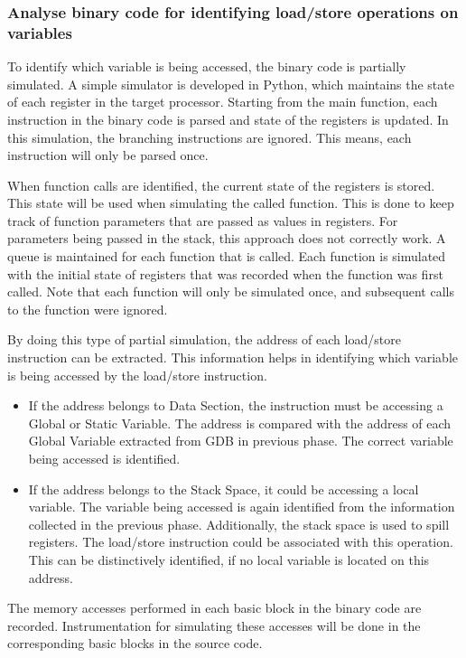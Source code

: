 \subsubsection{Analyse binary code for identifying load/store operations on variables}
To identify which variable is being accessed, the binary code is partially simulated. A simple simulator is developed in Python, which maintains the state of each register in the target processor. Starting from the main function, each instruction in the binary code is parsed and state of the registers is updated. In this simulation, the branching instructions are ignored. This means, each instruction will only be parsed once. 

When function calls are identified, the current state of the registers is stored. This state will be used when simulating the called function. This is done to keep track of function parameters that are passed as values in registers. For parameters being passed in the stack, this approach does not correctly work. A queue is maintained for each function that is called. Each function is simulated with the initial state of registers that was recorded when the function was first called. Note that each function will only be simulated once, and subsequent calls to the function were ignored.

By doing this type of partial simulation, the address of each load/store instruction can be extracted. This information helps in identifying which variable is being accessed by the load/store instruction. 

\begin{itemize}
\item If the address belongs to Data Section, the instruction must be accessing a Global or Static Variable. The address is compared with the address of each Global Variable extracted from GDB in previous phase. The correct variable being accessed is identified. 
\item If the address belongs to the Stack Space, it could be accessing a local variable. The variable being accessed is again identified from the information collected in the previous phase. Additionally, the stack space is used to spill registers. The load/store instruction could be associated with this operation. This can be distinctively identified, if no local variable is located on this address.
\end{itemize}

The memory accesses performed in each basic block in the binary code are recorded. Instrumentation for simulating these accesses will be done in the corresponding basic blocks in the source code. 

